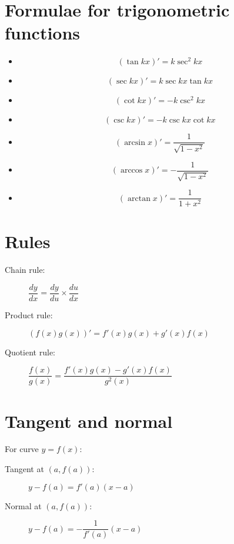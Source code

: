 \section{Formulae for trigonometric functions}
\begin{itemize}
    \item \[(\tan kx)' = k\sec^2 kx\]
    \item \[(\sec kx)' = k\sec kx \tan kx\]
    \item \[(\cot kx)' = -k\csc^2 kx\]
    \item \[(\csc kx)' = -k\csc kx \cot kx\]
    \item \[(\arcsin x)' = \frac{1}{\sqrt{1-x^2}}\]
    \item \[(\arccos x)' = -\frac{1}{\sqrt{1-x^2}}\]
    \item \[(\arctan x)' = \frac{1}{1+x^2}\]
\end{itemize}

\section{Rules}
\begin{description}
    \item[Chain rule:] $\dfrac{dy}{dx} = \dfrac{dy}{du} \times \dfrac{du}{dx}$
    \item[Product rule:] $(f(x)g(x))'=f'(x)g(x)+g'(x)f(x)$
    \item[Quotient rule:] $\dfrac{f(x)}{g(x)} = \dfrac{f'(x)g(x)-g'(x)f(x)}{g^2(x)}$
\end{description}


\section{Tangent and normal}
For curve $y=f(x)$:
\begin{description}
    \item[Tangent at $(a,f(a))$:] $y-f(a)=f'(a)(x-a)$
    \item[Normal at $(a,f(a))$:] $y-f(a)=-\dfrac{1}{f'(a)}(x-a)$
\end{description}